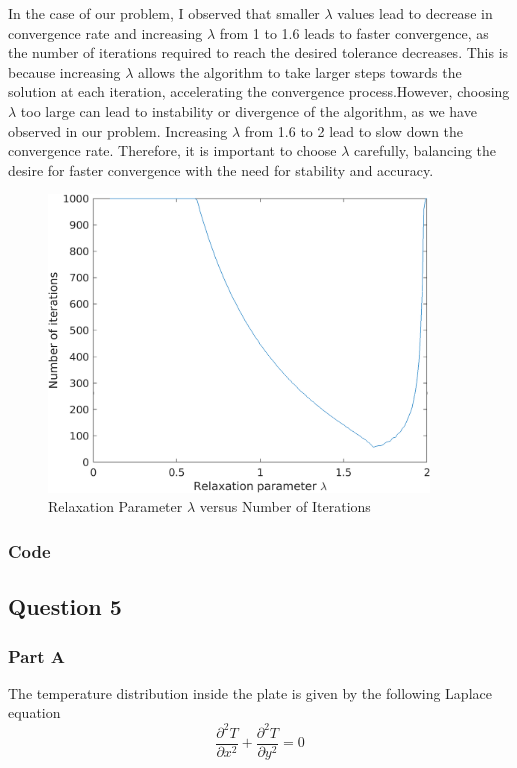 \documentclass[12pt, a4paper]{article}
\begin{document}
In the case of our problem, I observed that smaller $\lambda$ values lead to decrease in convergence rate and increasing $\lambda$ from 1 to 1.6 leads to faster convergence, as the number of iterations required to reach the desired tolerance decreases. This is because increasing $\lambda$ allows the algorithm to take larger steps towards the solution at each iteration, accelerating the convergence process.However, choosing $\lambda$ too large can lead to instability or divergence of the algorithm, as we have observed in our problem. Increasing $\lambda$ from 1.6 to 2 lead to slow down the convergence rate. Therefore, it is important to choose $\lambda$ carefully, balancing the desire for faster convergence with the need for stability and accuracy.

\begin{figure}
  \centering
  \includegraphics[width=0.9\textwidth]{img/lambda_vs_noi.png}
  \captionsetup{justification=centering}
  \caption{Relaxation Parameter $\lambda$ versus Number of Iterations}
\end{figure}

\newpage
\subsubsection{Code}


\subsection{Question 5}
\subsubsection{Part A}
The temperature distribution inside the
plate is given by the following Laplace equation
\begin{equation}
\frac{\partial^2 T}{\partial x^2} + \frac{\partial^2 T}{\partial y^2} = 0
\end{equation}
\end{document}

